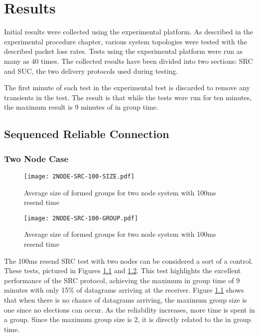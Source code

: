 \chapter{Results}

Initial results were collected using the experimental platform. As described in
the experimental procedure chapter, various system topologies were tested with
the described packet loss rates. Tests using the experimental platform were run
as many as 40 times. The collected results have been divided into two sections:
SRC and SUC, the two delivery protocols used during testing.

The first minute of each test in the experimental test is discarded to remove
any transients in the test. The result is that while the tests were run for
ten minutes, the maximum result is 9 minutes of in group time.

\section{Sequenced Reliable Connection}

\subsection{Two Node Case}

\begin{figure}[!h]
\centering
\texttt{[image: 2NODE-SRC-100-SIZE.pdf]}
\caption{Average size of formed groups for two node system with 100ms resend time}
\label{fig:MGS-SRC-2NODE-100}
\end{figure}

\begin{figure}[!h]
\centering
\texttt{[image: 2NODE-SRC-100-GROUP.pdf]}
\caption{Average size of formed groups for two node system with 100ms resend time}
\label{fig:IGT-SRC-2NODE-100}
\end{figure}

The 100ms resend SRC test with two nodes can be considered a sort of a control.
These tests, pictured in Figures \ref{fig:MGS-SRC-2NODE-100} and
\ref{fig:IGT-SRC-2NODE-100}. This test highlights the excellent performance of the
SRC protocol, achieving the maximum in group time of 9 minutes with only 15\%
of datagrams arriving at the receiver. Figure \ref{fig:MGS-SRC-2NODE-100} shows
that when there is no chance of datagrams arriving, the maximum group size is
one since no elections can occur. As the reliability increases, more time is
spent in a group. Since the maximum group size is 2, it is directly related to
the in group time.

